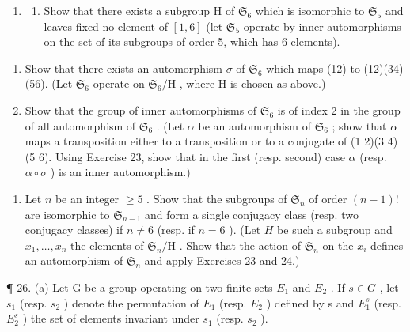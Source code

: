 \begin{enumerate}
\def\labelenumi{\arabic{enumi}.}
\setcounter{enumi}{23}
\tightlist
\item
  \begin{enumerate}
  \def\labelenumii{(\alph{enumii})}
  \tightlist
  \item
    Show that there exists a subgroup H of \(\mathfrak{S}_6\) which is isomorphic to \(\mathfrak{S}_5\) and leaves fixed no element of \([1,6]\) (let \(\mathfrak{S}_5\) operate by inner automorphisms on the set of its subgroups of order 5, which has 6 elements).
  \end{enumerate}
\end{enumerate}

\begin{enumerate}
\def\labelenumi{(\alph{enumi})}
\setcounter{enumi}{1}
\item
  Show that there exists an automorphism \(\sigma\) of \(\mathfrak{S}_{6}\) which maps (12) to (12)(34)(56). (Let \(\mathfrak{S}_{6}\) operate on \(\mathfrak{S}_{6} / \mathrm{H}\) , where \(\mathrm{H}\) is chosen as above.)
\item
  Show that the group of inner automorphisms of \(\mathfrak{S}_{6}\) is of index 2 in the group of all automorphism of \(\mathfrak{S}_{6}\) . (Let \(\alpha\) be an automorphism of \(\mathfrak{S}_{6}\) ; show that \(\alpha\) maps a transposition either to a transposition or to a conjugate of (1 2)(3 4)(5 6). Using Exercise 23, show that in the first (resp. second) case \(\alpha\) (resp. \(\alpha \circ \sigma\) ) is an inner automorphism.)
\end{enumerate}

\begin{enumerate}
\def\labelenumi{\arabic{enumi}.}
\setcounter{enumi}{24}
\tightlist
\item
  Let \(n\) be an integer \(\geqslant 5\) . Show that the subgroups of \(\mathfrak{S}_n\) of order \((n - 1)!\) are isomorphic to \(\mathfrak{S}_{n-1}\) and form a single conjugacy class (resp. two conjugacy classes) if \(n \neq 6\) (resp. if \(n = 6\) ). (Let \(H\) be such a subgroup and \(x_1, \ldots, x_n\) the elements of \(\mathfrak{S}_n / \mathrm{H}\) . Show that the action of \(\mathfrak{S}_n\) on the \(x_i\) defines an automorphism of \(\mathfrak{S}_n\) and apply Exercises 23 and 24.)
\end{enumerate}

¶ 26. (a) Let G be a group operating on two finite sets \(E_{1}\) and \(E_{2}\) . If \(s \in G\) , let \(s_{1}\) (resp. \(s_{2}\) ) denote the permutation of \(E_{1}\) (resp. \(E_{2}\) ) defined by s and \(E_{1}^{s}\) (resp. \(E_{2}^{s}\) ) the set of elements invariant under \(s_{1}\) (resp. \(s_{2}\) ).

